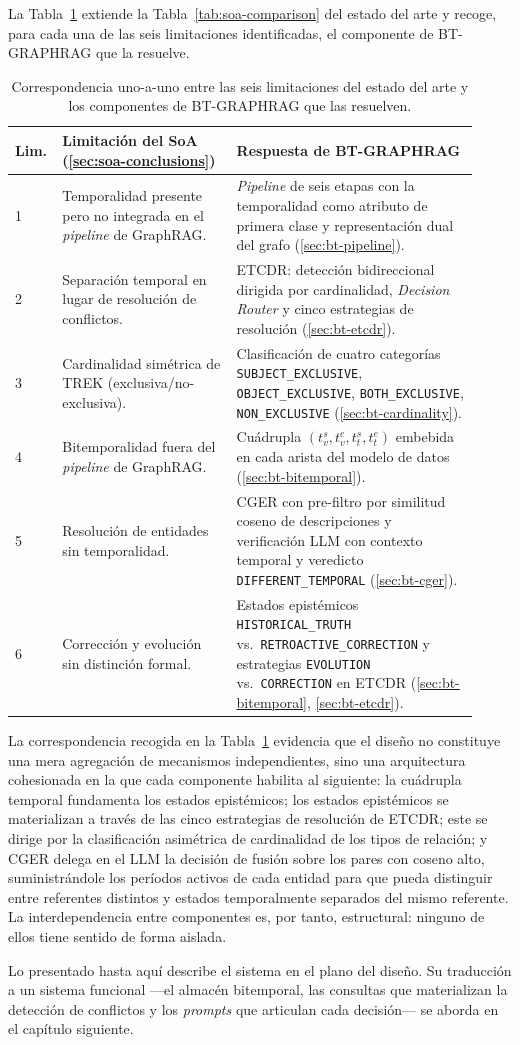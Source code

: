 La Tabla~\ref{tab:bt-vs-soa} extiende la Tabla~\ref{tab:soa-comparison} del estado del arte y recoge, para cada una de las seis limitaciones identificadas, el componente de BT-GRAPHRAG que la resuelve.

\begin{table}[h]
\centering
\small
\begin{tabular}{p{0.06\linewidth}p{0.36\linewidth}p{0.50\linewidth}}
\hline
\textbf{Lim.} & \textbf{Limitación del SoA (\ref{sec:soa-conclusions})} & \textbf{Respuesta de BT-GRAPHRAG} \\ \hline
1 & Temporalidad presente pero no integrada en el \emph{pipeline} de GraphRAG. & \emph{Pipeline} de seis etapas con la temporalidad como atributo de primera clase y representación dual del grafo (\ref{sec:bt-pipeline}). \\
2 & Separación temporal en lugar de resolución de conflictos. & ETCDR: detección bidireccional dirigida por cardinalidad, \emph{Decision Router} y cinco estrategias de resolución (\ref{sec:bt-etcdr}). \\
3 & Cardinalidad simétrica de TREK (exclusiva/no-exclusiva). & Clasificación de cuatro categorías \texttt{SUBJECT\_EXCLUSIVE}, \texttt{OBJECT\_EXCLUSIVE}, \texttt{BOTH\_EXCLUSIVE}, \texttt{NON\_EXCLUSIVE} (\ref{sec:bt-cardinality}). \\
4 & Bitemporalidad fuera del \emph{pipeline} de GraphRAG. & Cuádrupla $(t_v^s, t_v^e, t_t^s, t_t^e)$ embebida en cada arista del modelo de datos (\ref{sec:bt-bitemporal}). \\
5 & Resolución de entidades sin temporalidad. & CGER con pre-filtro por similitud coseno de descripciones y verificación LLM con contexto temporal y veredicto \texttt{DIFFERENT\_TEMPORAL} (\ref{sec:bt-cger}). \\
6 & Corrección y evolución sin distinción formal. & Estados epistémicos \texttt{HISTORICAL\_TRUTH} vs.\ \texttt{RETROACTIVE\_CORRECTION} y estrategias \texttt{EVOLUTION} vs.\ \texttt{CORRECTION} en ETCDR (\ref{sec:bt-bitemporal}, \ref{sec:bt-etcdr}). \\ \hline
\end{tabular}
\caption{Correspondencia uno-a-uno entre las seis limitaciones del estado del arte y los componentes de BT-GRAPHRAG que las resuelven.}
\label{tab:bt-vs-soa}
\end{table}

La correspondencia recogida en la Tabla~\ref{tab:bt-vs-soa} evidencia que el diseño no constituye una mera agregación de mecanismos independientes, sino una arquitectura cohesionada en la que cada componente habilita al siguiente: la cuádrupla temporal fundamenta los estados epistémicos; los estados epistémicos se materializan a través de las cinco estrategias de resolución de ETCDR; este se dirige por la clasificación asimétrica de cardinalidad de los tipos de relación; y CGER delega en el LLM la decisión de fusión sobre los pares con coseno alto, suministrándole los períodos activos de cada entidad para que pueda distinguir entre referentes distintos y estados temporalmente separados del mismo referente. La interdependencia entre componentes es, por tanto, estructural: ninguno de ellos tiene sentido de forma aislada.

Lo presentado hasta aquí describe el sistema en el plano del diseño. Su traducción a un sistema funcional ---el almacén bitemporal, las consultas que materializan la detección de conflictos y los \emph{prompts} que articulan cada decisión--- se aborda en el capítulo siguiente.
